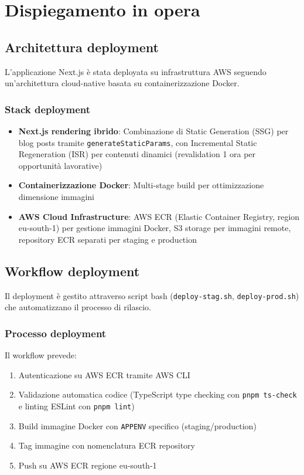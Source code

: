 \chapter{Dispiegamento in opera}

\section{Architettura deployment}

L'applicazione Next.js è stata deployata su infrastruttura AWS seguendo
un'architettura cloud-native basata su containerizzazione Docker.

\subsection{Stack deployment}

\begin{itemize}
  \item \textbf{Next.js rendering ibrido}: Combinazione di Static
Generation (SSG) per blog posts tramite \texttt{generateStaticParams}, con
Incremental Static Regeneration (ISR) per contenuti dinamici (revalidation
1 ora per opportunità lavorative)

    \item \textbf{Containerizzazione Docker}: Multi-stage build per
    ottimizzazione dimensione immagini

  \item \textbf{AWS Cloud Infrastructure}: AWS ECR (Elastic Container
Registry, region eu-south-1) per gestione immagini Docker, S3 storage per
immagini remote, repository ECR separati per staging e production
\end{itemize}

\section{Workflow deployment}

Il deployment è gestito attraverso script bash (\texttt{deploy-stag.sh},
\texttt{deploy-prod.sh}) che automatizzano il processo di rilascio.

\subsection{Processo deployment}

Il workflow prevede:
\begin{enumerate}
  \item Autenticazione su AWS ECR tramite AWS CLI
  \item Validazione automatica codice (TypeScript type checking con
\texttt{pnpm ts-check} e linting ESLint con \texttt{pnpm lint})
  \item Build immagine Docker con \texttt{APPENV} specifico
(staging/production)
  \item Tag immagine con nomenclatura ECR repository
  \item Push su AWS ECR regione eu-south-1
\end{enumerate}

